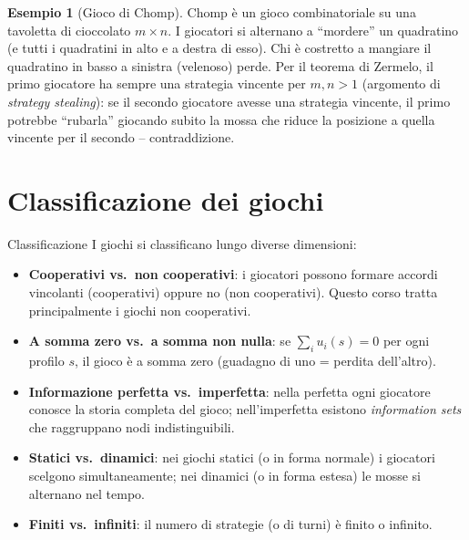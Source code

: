 \documentclass[12pt,a4paper,twoside]{book}
\theoremstyle{plain}
\theoremstyle{definition}
\newtheorem{example}[theorem]{Esempio}
\begin{document}
\begin{example}[Gioco di Chomp]
Chomp è un gioco combinatoriale su una tavoletta di cioccolato $m\times n$. I giocatori si alternano a ``mordere'' un quadratino (e tutti i quadratini in alto e a destra di esso). Chi è costretto a mangiare il quadratino in basso a sinistra (velenoso) perde. Per il teorema di Zermelo, il primo giocatore ha sempre una strategia vincente per $m,n>1$ (argomento di \emph{strategy stealing}): se il secondo giocatore avesse una strategia vincente, il primo potrebbe ``rubarla'' giocando subito la mossa che riduce la posizione a quella vincente per il secondo -- contraddizione.
\end{example}

\section{Classificazione dei giochi}

\begin{defbox}{Classificazione}
I giochi si classificano lungo diverse dimensioni:
\begin{itemize}
  \item \textbf{Cooperativi vs.\ non cooperativi}: i giocatori possono formare accordi vincolanti (cooperativi) oppure no (non cooperativi). Questo corso tratta principalmente i giochi non cooperativi.
  \item \textbf{A somma zero vs.\ a somma non nulla}: se $\sum_i u_i(s)=0$ per ogni profilo $s$, il gioco è a somma zero (guadagno di uno = perdita dell'altro).
  \item \textbf{Informazione perfetta vs.\ imperfetta}: nella perfetta ogni giocatore conosce la storia completa del gioco; nell'imperfetta esistono \emph{information sets} che raggruppano nodi indistinguibili.
  \item \textbf{Statici vs.\ dinamici}: nei giochi statici (o in forma normale) i giocatori scelgono simultaneamente; nei dinamici (o in forma estesa) le mosse si alternano nel tempo.
  \item \textbf{Finiti vs.\ infiniti}: il numero di strategie (o di turni) è finito o infinito.
\end{itemize}
\end{defbox}
\end{document}
